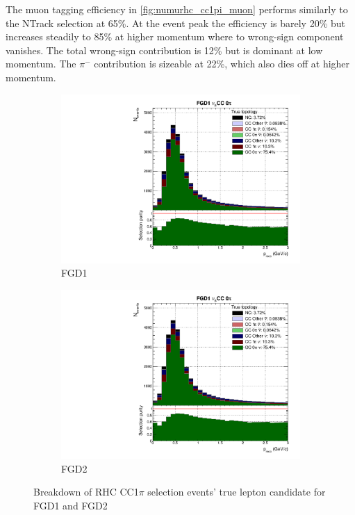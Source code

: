 The muon tagging efficiency in \autoref{fig:numurhc_cc1pi_muon} performs similarly to the NTrack selection at 65\%. At the event peak the efficiency is barely 20\% but increases steadily to 85\% at higher momentum where to wrong-sign component vanishes. The total wrong-sign contribution is 12\% but is dominant at low momentum. The $\pi^-$ contribution is sizeable at 22\%, which also dies off at higher momentum.
\begin{figure}[h]
	\begin{subfigure}[t]{0.49\textwidth}
		\includegraphics[width=\textwidth,page=28, trim={0mm 0mm 0mm 9mm}, clip]{figures/mach3/2018/Selection/2018_FullNoRedNDmatrix_rebin_verbose_may_diagnostics}
		\caption{FGD1}
	\end{subfigure}
	\begin{subfigure}[t]{0.49\textwidth}
		\includegraphics[width=\textwidth,page=34, trim={0mm 0mm 0mm 9mm}, clip]{figures/mach3/2018/Selection/2018_FullNoRedNDmatrix_rebin_verbose_may_diagnostics}
		\caption{FGD2}
	\end{subfigure}
	\caption{Breakdown of \numu RHC CC1$\pi$ selection events' true lepton candidate for FGD1 and FGD2}
	\label{fig:numurhc_cc1pi_muon}
\end{figure}

